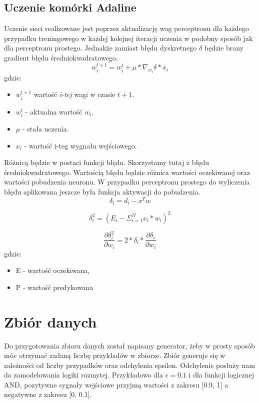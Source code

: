 \documentclass{article}
\begin{document}
    \subsection{Uczenie komórki Adaline}
    Uczenie sieci realizowane jest poprzez aktualizację wag perceptronu dla każdego przypadku treningowego w każdej kolejnej iteracji uczenia w podobny sposób jak dla perceptronu prostego. Jednakże zamiast błędu dyskretnego $\delta$ będzie brany gradient błędu średniokwadratowego.
    \begin{equation}
    w_i^{t+1} = w_i^t + \mu * \nabla_{w_i} \delta * x_i
    \end{equation}
    gdzie:
    \begin{itemize}
        \item $w_i^{t+1}$ wartość \textit{i-tej} wagi w czasie $t+1$.
        \item $w_i^t$ - aktualna wartość $w_i$.
        \item $\mu$ - stała uczenia.
        \item $x_i$ - wartość i-teg wygnału wejściowego.
    \end{itemize}
    Różnicą będzie w postaci funkcji błędu. Skorzystamy tutaj z błędu średniokwadratowego. Wartością błędu będzie różnica wartości oczekiwanej oraz wartości pobudzenia neuronu. W przypadku perceptronu prostego do wyliczenia błędu aplikowana jeszcze była funkcja aktywacji do pobudzenia.
    \begin{equation}
    \delta_i = d_i - x^Tw 
    \end{equation}
    
    \begin{equation}
     \delta_i^2 = (E_i - \Sigma_{i=1}^{N} x_i*w_i )^2 
     \end{equation}
     
     \begin{equation}
     \frac{\partial \delta_i^2}{\partial w_i} = 2 * \delta_i * \frac{\partial \delta_i}{\partial w_i}
     \end{equation}
    gdzie:
    \begin{itemize}
    	\item E - wartość oczekiwana,
    	\item P - wartość predykowana
    \end{itemize}
    
	\newpage
	\section{Zbiór danych}
	Do przygotowania zbioru danych został napisany generator, żeby w prosty sposób móc otrzymać zadaną liczbę przykładów w zbiorze. Zbiór generuje się w zależności od liczby przypadków oraz odchylenia epsilon. Odchylenie posłuży nam do zamodelowania logiki rozmytej. Przykładowo dla $\epsilon = 0.1$ i dla funkcji logicznej AND, pozytywne sygnały wejściowe przyjmą wartości z zakresu [0.9, 1] a negatywne z zakresu [0, 0.1].
	\newpage
\end{document}
